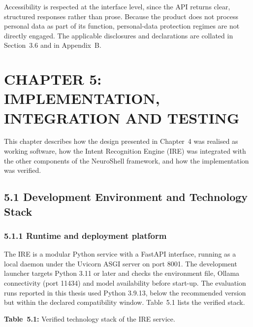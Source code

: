 \documentclass[
]{article}
\begin{document}
Accessibility is respected at the interface level, since the API returns
clear, structured responses rather than prose. Because the product does
not process personal data as part of its function, personal-data
protection regimes are not directly engaged. The applicable disclosures
and declarations are collated in Section~3.6 and in Appendix~B.

\hypertarget{chapter-5-implementation-integration-and-testing}{%
\section{CHAPTER 5: IMPLEMENTATION, INTEGRATION AND
TESTING}\label{chapter-5-implementation-integration-and-testing}}

This chapter describes how the design presented in Chapter~4 was
realised as working software, how the Intent Recognition Engine (IRE)
was integrated with the other components of the NeuroShell framework,
and how the implementation was verified.

\hypertarget{development-environment-and-technology-stack}{%
\subsection{5.1 Development Environment and Technology
Stack}\label{development-environment-and-technology-stack}}

\hypertarget{runtime-and-deployment-platform}{%
\subsubsection{5.1.1 Runtime and deployment
platform}\label{runtime-and-deployment-platform}}

The IRE is a modular Python service with a FastAPI interface, running as
a local daemon under the Uvicorn ASGI server on port 8001. The
development launcher targets Python 3.11 or later and checks the
environment file, Ollama connectivity (port 11434) and model
availability before start-up. The evaluation runs reported in this
thesis used Python 3.9.13, below the recommended version but within the
declared compatibility window. Table~5.1 lists the verified stack.

\protect\hypertarget{_Toc900102}{}{}\textbf{Table~5.1:} Verified
technology stack of the IRE service.
\end{document}
